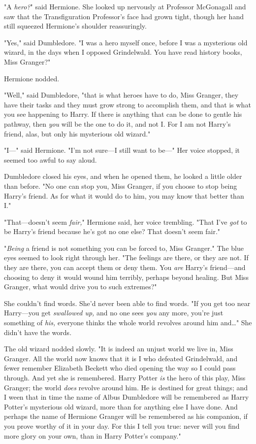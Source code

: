 "A \emph{hero?}" said Hermione. She looked up nervously at Professor McGonagall 
and saw that the Transfiguration Professor's face had grown tight, though her 
hand still squeezed Hermione's shoulder reassuringly.

"Yes," said Dumbledore. "I was a hero myself once, before I was a mysterious 
old wizard, in the days when I opposed Grindelwald. You have read history 
books, Miss Granger?"

Hermione nodded.

"Well," said Dumbledore, "that is what heroes have to do, Miss Granger, they 
have their tasks and they must grow strong to accomplish them, and that is what 
you see happening to Harry. If there is anything that can be done to gentle his 
pathway, then \emph{you} will be the one to do it, and not I. For I am not 
Harry's friend, alas, but only his mysterious old wizard."

"I---" said Hermione. "I'm not sure---I still want to be---" Her voice stopped, 
it seemed too awful to say aloud.

Dumbledore closed his eyes, and when he opened them, he looked a little older 
than before. "No one can stop you, Miss Granger, if you choose to stop being 
Harry's friend. As for what it would do to him, you may know that better than 
I."

"That---doesn't seem \emph{fair,}" Hermione said, her voice trembling. "That 
I've \emph{got} to be Harry's friend because he's got no one else? That doesn't 
seem fair."

"\emph{Being} a friend is not something you can be forced to, Miss Granger." 
The blue eyes seemed to look right through her. "The feelings are there, or 
they are not. If they are there, you can accept them or deny them. You 
\emph{are} Harry's friend---and choosing to deny it would wound him terribly, 
perhaps beyond healing. But Miss Granger, what would drive you to such 
extremes?"

She couldn't find words. She'd never been able to find words. "If you get too 
near Harry---you get \emph{swallowed up,} and no one sees \emph{you} any more, 
you're just something of \emph{his,} everyone thinks the whole world revolves 
around him and{\ldots}" She didn't have the words.

The old wizard nodded slowly. "It is indeed an unjust world we live in, Miss 
Granger. All the world now knows that it is I who defeated Grindelwald, and 
fewer remember Elizabeth Beckett who died opening the way so I could pass 
through. And yet she is remembered. Harry Potter \emph{is} the hero of this 
play, Miss Granger; the world \emph{does} revolve around him. He is destined 
for great things; and I ween that in time the name of Albus Dumbledore will be 
remembered as Harry Potter's mysterious old wizard, more than for anything else 
I have done. And perhaps the name of Hermione Granger will be remembered as his 
companion, if you prove worthy of it in your day. For this I tell you true: 
never will you find more glory on your own, than in Harry Potter's company."

